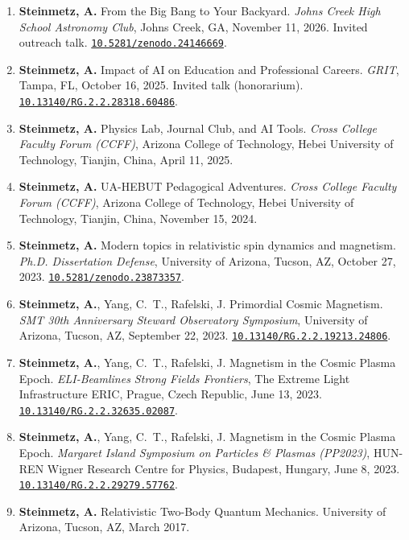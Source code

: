 \documentclass[11pt]{article}
\begin{document}
\begin{enumerate}[leftmargin=*,nosep]
    \item \textbf{Steinmetz, A.} From the Big Bang to Your Backyard. \textit{Johns Creek High School Astronomy Club}, Johns Creek, GA, November 11, 2026. Invited outreach talk. \href{https://doi.org/10.5281/zenodo.24146669}{\nolinkurl{10.5281/zenodo.24146669}}.
    \item \textbf{Steinmetz, A.} Impact of AI on Education and Professional Careers. \textit{GRIT}, Tampa, FL, October 16, 2025. Invited talk (honorarium). \href{https://doi.org/10.13140/RG.2.2.28318.60486}{\nolinkurl{10.13140/RG.2.2.28318.60486}}.
    \item \textbf{Steinmetz, A.} Physics Lab, Journal Club, and AI Tools. \textit{Cross College Faculty Forum (CCFF)}, Arizona College of Technology, Hebei University of Technology, Tianjin, China, April 11, 2025.
    \item \textbf{Steinmetz, A.} UA-HEBUT Pedagogical Adventures. \textit{Cross College Faculty Forum (CCFF)}, Arizona College of Technology, Hebei University of Technology, Tianjin, China, November 15, 2024.
    \item \textbf{Steinmetz, A.} Modern topics in relativistic spin dynamics and magnetism. \textit{Ph.D. Dissertation Defense}, University of Arizona, Tucson, AZ, October 27, 2023. \href{https://doi.org/10.5281/zenodo.23873357}{\nolinkurl{10.5281/zenodo.23873357}}.
    \item \textbf{Steinmetz, A.}, Yang, C.~T., Rafelski, J. Primordial Cosmic Magnetism. \textit{SMT 30th Anniversary Steward Observatory Symposium}, University of Arizona, Tucson, AZ, September 22, 2023. \href{https://doi.org/10.13140/RG.2.2.19213.24806}{\nolinkurl{10.13140/RG.2.2.19213.24806}}.
    \item \textbf{Steinmetz, A.}, Yang, C.~T., Rafelski, J. Magnetism in the Cosmic Plasma Epoch. \textit{ELI-Beamlines Strong Fields Frontiers}, The Extreme Light Infrastructure ERIC, Prague, Czech Republic, June 13, 2023. \href{https://doi.org/10.13140/RG.2.2.32635.02087}{\nolinkurl{10.13140/RG.2.2.32635.02087}}.
    \item \textbf{Steinmetz, A.}, Yang, C.~T., Rafelski, J. Magnetism in the Cosmic Plasma Epoch. \textit{Margaret Island Symposium on Particles \& Plasmas (PP2023)}, HUN-REN Wigner Research Centre for Physics, Budapest, Hungary, June 8, 2023. \href{https://doi.org/10.13140/RG.2.2.29279.57762}{\nolinkurl{10.13140/RG.2.2.29279.57762}}.
    \item \textbf{Steinmetz, A.} Relativistic Two-Body Quantum Mechanics. University of Arizona, Tucson, AZ, March 2017.
\end{enumerate}
\end{document}
